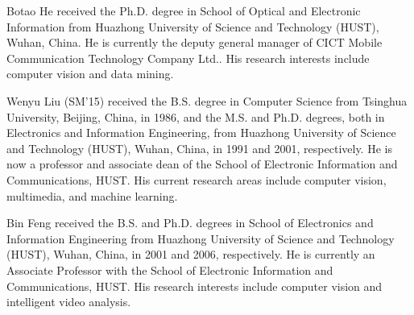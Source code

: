 \documentclass[journal]{IEEEtran}
\begin{document}
\begin{IEEEbiography}{Botao He} received the Ph.D. degree in School of Optical and Electronic Information from Huazhong University of Science and Technology (HUST), Wuhan, China. He is currently the deputy general manager of CICT Mobile Communication Technology Company Ltd.. His research interests include computer vision and data mining.
\end{IEEEbiography}

\begin{IEEEbiography} {Wenyu Liu (SM'15)} received the B.S. degree in Computer Science from Tsinghua University, Beijing, China, in 1986, and the M.S. and Ph.D. degrees, both in Electronics and Information Engineering, from Huazhong University of Science and Technology (HUST), Wuhan, China, in 1991 and 2001, respectively. He is now a professor and associate dean of the School of Electronic Information and Communications, HUST. His current research areas include computer vision, multimedia, and machine learning.
\end{IEEEbiography}

\begin{IEEEbiography} {Bin Feng} received the B.S. and Ph.D. degrees in School of Electronics and Information Engineering from Huazhong University of Science and Technology (HUST), Wuhan, China, in 2001 and 2006, respectively. He is currently an Associate Professor with the School of Electronic Information and Communications, HUST. His research interests include computer vision and intelligent video analysis.
\end{IEEEbiography}

\vfill
\end{document}

